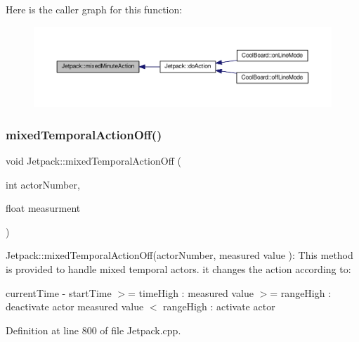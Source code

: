 Here is the caller graph for this function\+:\nopagebreak
\begin{figure}[H]
\begin{center}
\leavevmode
\includegraphics[width=350pt]{df/d1d/class_jetpack_acf8ed1fb594b9e8e224f4ed872a8e093_icgraph}
\end{center}
\end{figure}
\mbox{\label{class_jetpack_af2f567ef6311a8fc2f7bb948837667b7}} 
\subsubsection{\texorpdfstring{mixed\+Temporal\+Action\+Off()}{mixedTemporalActionOff()}}
{\footnotesize\ttfamily void Jetpack\+::mixed\+Temporal\+Action\+Off (\begin{DoxyParamCaption}\item[{int}]{actor\+Number,  }\item[{float}]{measurment }\end{DoxyParamCaption})}

Jetpack\+::mixed\+Temporal\+Action\+Off(actor\+Number, measured value )\+: This method is provided to handle mixed temporal actors. it changes the action according to\+:

current\+Time -\/ start\+Time $>$= time\+High \+: measured value $>$= range\+High \+: deactivate actor measured value $<$ range\+High \+: activate actor 

Definition at line 800 of file Jetpack.\+cpp.


